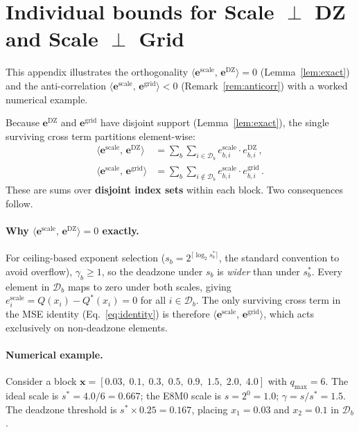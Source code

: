 \documentclass{article}
\theoremstyle{definition}
\theoremstyle{remark}
\newcommand{\cD}{\mathcal{D}}
\newcommand{\bx}{\bm{x}}
\newcommand{\be}{\bm{e}}
\newcommand{\inner}[2]{\langle #1,\, #2 \rangle}
\begin{document}
\section{Individual bounds for Scale $\perp$ DZ and Scale $\perp$ Grid}
\label{app:individual_bounds}

This appendix illustrates the orthogonality $\inner{\be^{\mathrm{scale}}}{\be^{\mathrm{DZ}}} = 0$ (Lemma~\ref{lem:exact}) and the anti-correlation $\inner{\be^{\mathrm{scale}}}{\be^{\mathrm{grid}}} < 0$ (Remark~\ref{rem:anticorr}) with a worked numerical example.

Because $\be^{\mathrm{DZ}}$ and $\be^{\mathrm{grid}}$ have disjoint support (Lemma~\ref{lem:exact}), the single surviving cross term partitions element-wise:
\begin{align}
  \inner{\be^{\mathrm{scale}}}{\be^{\mathrm{DZ}}}
  &= \sum_{b}\sum_{i \in \cD_b} e_{b,i}^{\mathrm{scale}} \cdot e_{b,i}^{\mathrm{DZ}}\,, \\
  \inner{\be^{\mathrm{scale}}}{\be^{\mathrm{grid}}}
  &= \sum_{b}\sum_{i \notin \cD_b} e_{b,i}^{\mathrm{scale}} \cdot e_{b,i}^{\mathrm{grid}}\,.
\end{align}
These are sums over \textbf{disjoint index sets} within each block. Two consequences follow.

\paragraph{Why $\inner{\be^{\mathrm{scale}}}{\be^{\mathrm{DZ}}} = 0$ exactly.}
For ceiling-based exponent selection ($s_b = 2^{\lceil\log_2 s_b^*\rceil}$, the standard convention to avoid overflow), $\gamma_b \geq 1$, so the deadzone under $s_b$ is \emph{wider} than under $s_b^*$. Every element in $\cD_b$ maps to zero under both scales, giving $e_i^{\mathrm{scale}} = Q(x_i) - Q^*(x_i) = 0$ for all $i \in \cD_b$. The only surviving cross term in the MSE identity (Eq.~\ref{eq:identity}) is therefore $\inner{\be^{\mathrm{scale}}}{\be^{\mathrm{grid}}}$, which acts exclusively on non-deadzone elements.

\paragraph{Numerical example.}
Consider a block $\bx = [0.03,\; 0.1,\; 0.3,\; 0.5,\; 0.9,\; 1.5,\; 2.0,\; 4.0]$ with $q_{\max}{=}6$. The ideal scale is $s^* = 4.0/6 = 0.667$; the E8M0 scale is $s = 2^0 = 1.0$; $\gamma = s/s^* = 1.5$. The deadzone threshold is $s^* \times 0.25 = 0.167$, placing $x_1{=}0.03$ and $x_2{=}0.1$ in $\cD_b$.
\end{document}
